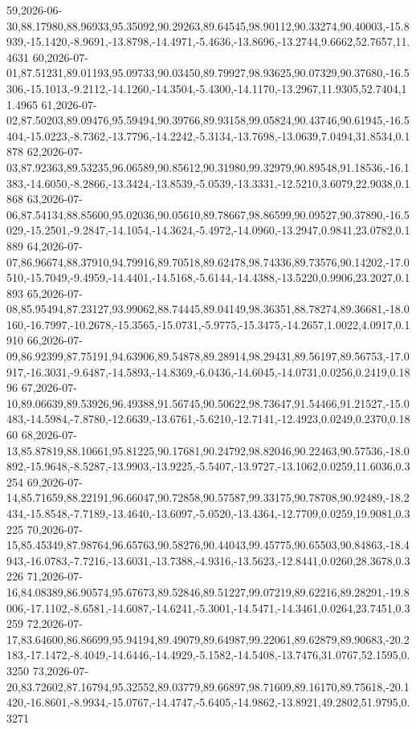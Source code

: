 \documentclass{eic-bcc-tcc}
\begin{document}
{59,2026-06-30,88.17980,88.96933,95.35092,90.29263,89.64545,98.90112,90.33274,90.40003,-15.8939,-15.1420,-8.9691,-13.8798,-14.4971,-5.4636,-13.8696,-13.2744,9.6662,52.7657,11.4631
60,2026-07-01,87.51231,89.01193,95.09733,90.03450,89.79927,98.93625,90.07329,90.37680,-16.5306,-15.1013,-9.2112,-14.1260,-14.3504,-5.4300,-14.1170,-13.2967,11.9305,52.7404,11.4965
61,2026-07-02,87.50203,89.09476,95.59494,90.39766,89.93158,99.05824,90.43746,90.61945,-16.5404,-15.0223,-8.7362,-13.7796,-14.2242,-5.3134,-13.7698,-13.0639,7.0494,31.8534,0.1878
62,2026-07-03,87.92363,89.53235,96.06589,90.85612,90.31980,99.32979,90.89548,91.18536,-16.1383,-14.6050,-8.2866,-13.3424,-13.8539,-5.0539,-13.3331,-12.5210,3.6079,22.9038,0.1868
63,2026-07-06,87.54134,88.85600,95.02036,90.05610,89.78667,98.86599,90.09527,90.37890,-16.5029,-15.2501,-9.2847,-14.1054,-14.3624,-5.4972,-14.0960,-13.2947,0.9841,23.0782,0.1889
64,2026-07-07,86.96674,88.37910,94.79916,89.70518,89.62478,98.74336,89.73576,90.14202,-17.0510,-15.7049,-9.4959,-14.4401,-14.5168,-5.6144,-14.4388,-13.5220,0.9906,23.2027,0.1893
65,2026-07-08,85.95494,87.23127,93.99062,88.74445,89.04149,98.36351,88.78274,89.36681,-18.0160,-16.7997,-10.2678,-15.3565,-15.0731,-5.9775,-15.3475,-14.2657,1.0022,4.0917,0.1910
66,2026-07-09,86.92399,87.75191,94.63906,89.54878,89.28914,98.29431,89.56197,89.56753,-17.0917,-16.3031,-9.6487,-14.5893,-14.8369,-6.0436,-14.6045,-14.0731,0.0256,0.2419,0.1896
67,2026-07-10,89.06639,89.53926,96.49388,91.56745,90.50622,98.73647,91.54466,91.21527,-15.0483,-14.5984,-7.8780,-12.6639,-13.6761,-5.6210,-12.7141,-12.4923,0.0249,0.2370,0.1860
68,2026-07-13,85.87819,88.10661,95.81225,90.17681,90.24792,98.82046,90.22463,90.57536,-18.0892,-15.9648,-8.5287,-13.9903,-13.9225,-5.5407,-13.9727,-13.1062,0.0259,11.6036,0.3254
69,2026-07-14,85.71659,88.22191,96.66047,90.72858,90.57587,99.33175,90.78708,90.92489,-18.2434,-15.8548,-7.7189,-13.4640,-13.6097,-5.0520,-13.4364,-12.7709,0.0259,19.9081,0.3225
70,2026-07-15,85.45349,87.98764,96.65763,90.58276,90.44043,99.45775,90.65503,90.84863,-18.4943,-16.0783,-7.7216,-13.6031,-13.7388,-4.9316,-13.5623,-12.8441,0.0260,28.3678,0.3226
71,2026-07-16,84.08389,86.90574,95.67673,89.52846,89.51227,99.07219,89.62216,89.28291,-19.8006,-17.1102,-8.6581,-14.6087,-14.6241,-5.3001,-14.5471,-14.3461,0.0264,23.7451,0.3259
72,2026-07-17,83.64600,86.86699,95.94194,89.49079,89.64987,99.22061,89.62879,89.90683,-20.2183,-17.1472,-8.4049,-14.6446,-14.4929,-5.1582,-14.5408,-13.7476,31.0767,52.1595,0.3250
73,2026-07-20,83.72602,87.16794,95.32552,89.03779,89.66897,98.71609,89.16170,89.75618,-20.1420,-16.8601,-8.9934,-15.0767,-14.4747,-5.6405,-14.9862,-13.8921,49.2802,51.9795,0.3271
}
\end{document}
